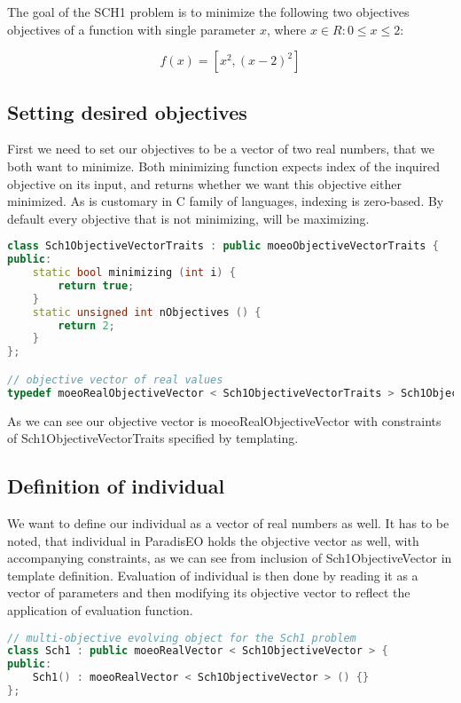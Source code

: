 \documentclass[12pt,oneside]{fithesis2}
\begin{document}
The goal of the SCH1 problem is to minimize the following two objectives objectives of a function with single parameter $x$, where $x \in R: 0 \leq x \leq 2$:

$$f(x) = [x^2,(x-2)^2]$$

\subsection{Setting desired objectives}

First we need to set our objectives to be a vector of two real numbers, that we both want to minimize. Both minimizing function expects index of the inquired objective on its input, and returns whether we want this objective either minimized. As is customary in C family of languages, indexing is zero-based. 
By default every objective that is not minimizing, will be maximizing.

\begin{lstlisting}[language=C++,label=composition,caption=Objectective initialization]
class Sch1ObjectiveVectorTraits : public moeoObjectiveVectorTraits {
public:
    static bool minimizing (int i) {
        return true;
    }
    static unsigned int nObjectives () {
        return 2;
    }
};

// objective vector of real values
typedef moeoRealObjectiveVector < Sch1ObjectiveVectorTraits > Sch1ObjectiveVector;
\end{lstlisting}
As we can see our objective vector is moeoRealObjectiveVector with constraints of Sch1ObjectiveVectorTraits specified by templating.

\subsection{Definition of individual}
We want to define our individual as a vector of real numbers as well. It has to be noted, that individual in ParadisEO holds the objective vector as well, with accompanying constraints, as we can see from inclusion of Sch1ObjectiveVector in template definition. Evaluation of individual is then done by reading it as a vector of parameters and then modifying its objective vector to reflect the application of evaluation function.

\begin{lstlisting}[language=C++,label=composition,caption=Individual initialization]
// multi-objective evolving object for the Sch1 problem
class Sch1 : public moeoRealVector < Sch1ObjectiveVector > {
public:
    Sch1() : moeoRealVector < Sch1ObjectiveVector > () {}
};
\end{lstlisting}
\end{document}
